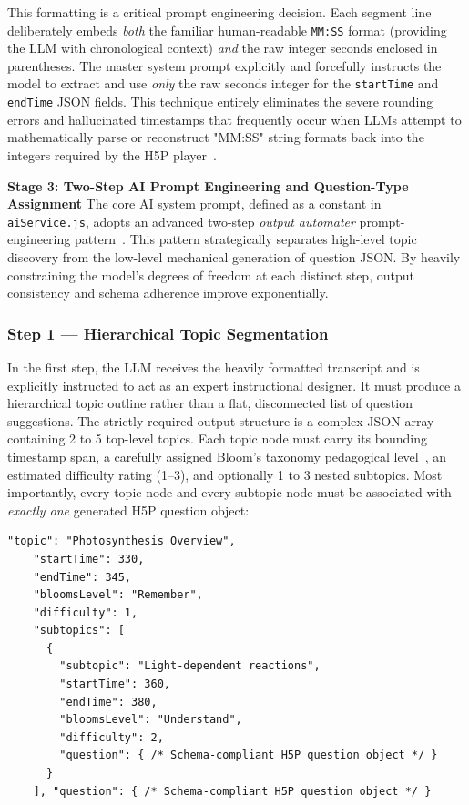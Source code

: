 This formatting is a critical prompt engineering decision. Each segment line deliberately embeds \emph{both} the familiar human-readable \texttt{MM:SS} format (providing the LLM with chronological context) \emph{and} the raw integer seconds enclosed in parentheses. The master system prompt explicitly and forcefully instructs the model to extract and use \emph{only} the raw seconds integer for the \texttt{startTime} and \texttt{endTime} JSON fields. This technique entirely eliminates the severe rounding errors and hallucinated timestamps that frequently occur when LLMs attempt to mathematically parse or reconstruct "MM:SS" string formats back into the integers required by the H5P player~\cite{white2023}.

\textbf{Stage 3: Two-Step AI Prompt Engineering and Question-Type Assignment}
\label{sec:stage3}
The core AI system prompt, defined as a constant in \texttt{aiService.js}, adopts an advanced two-step \emph{output automater} prompt-engineering pattern~\cite{white2023}. This pattern strategically separates high-level topic discovery from the low-level mechanical generation of question JSON. By heavily constraining the model's degrees of freedom at each distinct step, output consistency and schema adherence improve exponentially.

\subsubsection{Step 1 --- Hierarchical Topic Segmentation}In the first step, the LLM receives the heavily formatted transcript and is explicitly instructed to act as an expert instructional designer. It must produce a hierarchical topic outline rather than a flat, disconnected list of question suggestions. The strictly required output structure is a complex JSON array containing 2 to 5 top-level topics. Each topic node must carry its bounding timestamp span, a carefully assigned Bloom's taxonomy pedagogical level~\cite{anderson2001}, an estimated difficulty rating (1--3), and optionally 1 to 3 nested subtopics. Most importantly, every topic node and every subtopic node must be associated with \emph{exactly one} generated H5P question object:

\begin{lstlisting}[language={},caption={Strictly required JSON output structure for Step 1 (hierarchical topic segmentation)}]
    "topic": "Photosynthesis Overview",
    "startTime": 330,
    "endTime": 345,
    "bloomsLevel": "Remember",
    "difficulty": 1,
    "subtopics": [
      {
        "subtopic": "Light-dependent reactions",
        "startTime": 360,
        "endTime": 380,
        "bloomsLevel": "Understand",
        "difficulty": 2,
        "question": { /* Schema-compliant H5P question object */ }
      }
    ], "question": { /* Schema-compliant H5P question object */ }
\end{lstlisting}

